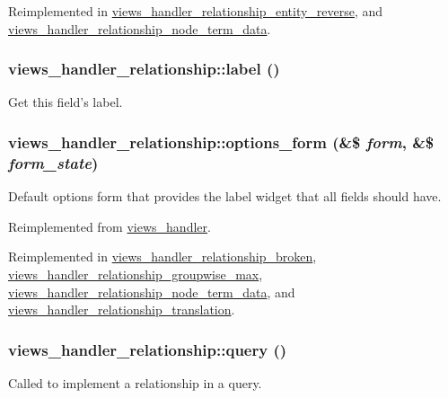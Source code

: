 Reimplemented in \hyperlink{classviews__handler__relationship__entity__reverse_a2005d343471091fbaa65ca49e56720d3}{views\_\-handler\_\-relationship\_\-entity\_\-reverse}, and \hyperlink{classviews__handler__relationship__node__term__data_a85e3c68c3338ca221d436eb13914bd68}{views\_\-handler\_\-relationship\_\-node\_\-term\_\-data}.\hypertarget{classviews__handler__relationship_af39d860cac5cd67836901304a08b43a0}{
\subsubsection[{label}]{\setlength{\rightskip}{0pt plus 5cm}views\_\-handler\_\-relationship::label ()}}
\label{classviews__handler__relationship_af39d860cac5cd67836901304a08b43a0}
Get this field's label. \hypertarget{classviews__handler__relationship_a08cc3f5947964d936b5e88d198f82c30}{
\subsubsection[{options\_\-form}]{\setlength{\rightskip}{0pt plus 5cm}views\_\-handler\_\-relationship::options\_\-form (\&\$ {\em form}, \/  \&\$ {\em form\_\-state})}}
\label{classviews__handler__relationship_a08cc3f5947964d936b5e88d198f82c30}
Default options form that provides the label widget that all fields should have. 

Reimplemented from \hyperlink{classviews__handler_aa41fcf16b177eb03e35facbae6320f74}{views\_\-handler}.

Reimplemented in \hyperlink{classviews__handler__relationship__broken_aa421a42866d049732e8747669466ae0e}{views\_\-handler\_\-relationship\_\-broken}, \hyperlink{classviews__handler__relationship__groupwise__max_a9cac8b627e41265e500d1a36f4d8f621}{views\_\-handler\_\-relationship\_\-groupwise\_\-max}, \hyperlink{classviews__handler__relationship__node__term__data_a976c536bb78f58c8919b95917a84d2bd}{views\_\-handler\_\-relationship\_\-node\_\-term\_\-data}, and \hyperlink{classviews__handler__relationship__translation_aca4668f3619b0fc6182e12cbaf38b633}{views\_\-handler\_\-relationship\_\-translation}.\hypertarget{classviews__handler__relationship_a7dc0b6371807dbf06efa594cb52b3348}{
\subsubsection[{query}]{\setlength{\rightskip}{0pt plus 5cm}views\_\-handler\_\-relationship::query ()}}
\label{classviews__handler__relationship_a7dc0b6371807dbf06efa594cb52b3348}
Called to implement a relationship in a query. 

